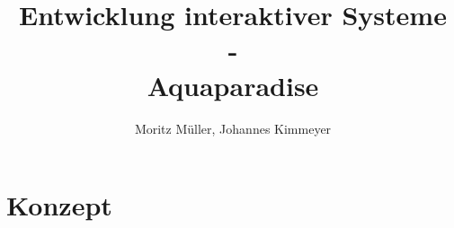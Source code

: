\documentclass[12pt,a4paper,ngerman]{scrreprt}
\begin{document}
 \title{Entwicklung interaktiver Systeme\\
  -\\
 Aquaparadise}
\author{Moritz Müller, Johannes Kimmeyer}
\maketitle
\tableofcontents
















\listoftables \listoffigures
\printbibliography
\appendix



\chapter{Konzept}


\end{document}
